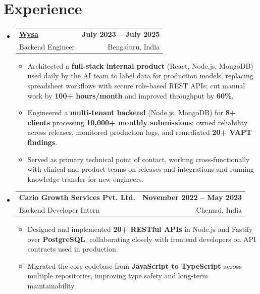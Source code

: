 \documentclass[letterpaper,10pt]{article}
\makeatletter
\newcommand{\resumeItem}[1]{
  \item\small{#1\vspace{-1pt}}
}
\newcommand{\resumeSubheading}[4]{
  \vspace{1pt}\item
    \begin{tabular*}{0.985\textwidth}[t]{l@{\extracolsep{\fill}}r}
      \textbf{#1} & \textbf{\small #2} \\
      {\small\color{ResumeSlate} #3} & {\small\color{ResumeSlate} #4} \\
    \end{tabular*}\vspace{-6pt}
}
\newcommand{\resumeSubHeadingListStart}{\begin{itemize}[leftmargin=0.0in, label={}, itemsep=2pt, topsep=2pt]}
\newcommand{\resumeSubHeadingListEnd}{\end{itemize}}
\newcommand{\resumeItemListStart}{\begin{itemize}[leftmargin=0.18in, itemsep=2pt, topsep=1pt]}
\newcommand{\resumeItemListEnd}{\end{itemize}\vspace{-4pt}}
\makeatother
\begin{document}
\section{Experience}
\resumeSubHeadingListStart
  \resumeSubheading
    {\href{https://www.wysa.io}{Wysa}}{July 2023 -- July 2025}
    {Backend Engineer}{Bengaluru, India}
    \resumeItemListStart
      \resumeItem{Architected a \textbf{full-stack internal product} (React, Node.js, MongoDB) used daily by the AI team to label data for production models, replacing spreadsheet workflows with secure role-based REST APIs; cut manual work by \textbf{100+ hours/month} and improved throughput by \textbf{60\%}.}
      \resumeItem{Engineered a \textbf{multi-tenant backend} (Node.js, MongoDB) for \textbf{8+ clients} processing \textbf{10{,}000+ monthly submissions}; owned reliability across releases, monitored production logs, and remediated \textbf{20+ VAPT findings}.}
      \resumeItem{Served as primary technical point of contact, working cross-functionally with clinical and product teams on releases and integrations and running knowledge transfer for new engineers.}
    \resumeItemListEnd
  \resumeSubheading
    {Cario Growth Services Pvt. Ltd.}{November 2022 -- May 2023}
    {Backend Developer Intern}{Chennai, India}
    \resumeItemListStart
      \resumeItem{Designed and implemented \textbf{20+ RESTful APIs} in Node.js and Fastify over \textbf{PostgreSQL}, collaborating closely with frontend developers on API contracts used in production.}
      \resumeItem{Migrated the core codebase from \textbf{JavaScript to TypeScript} across multiple repositories, improving type safety and long-term maintainability.}
    \resumeItemListEnd
\resumeSubHeadingListEnd
\vspace{-4pt}
\end{document}
